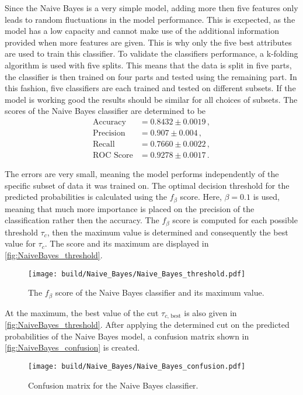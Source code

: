Since the Naive Bayes is a very simple model, adding more then five features only leads to random
fluctuations in the model performance. This is excpected, as the model has a low capacity and
cannot make use of the additional information provided when more features are given.
This is why only the five best attributes are used to train this classifier.
To validate the classifiers performance, a k-folding algorithm is used with five splits.
This means that the data is split in five parts, the classifier is then trained on four parts and tested using
the remaining part. In this fashion, five classifiers are each trained and tested on different subsets.
If the model is working good the results should be similar for all choices of subsets.
The scores of the Naive Bayes classifier are determined to be
\begin{align*}
  \text{Accuracy} &= 0.8432\pm0.0019 \,, \\
  \text{Precision} &= 0.907\pm0.004 \,, \\
  \text{Recall} &= 0.7660\pm0.0022 \,, \\
  \text{ROC Score} &= 0.9278\pm0.0017 \,.
\end{align*}

The errors are very small, meaning the model performs independently of the specific subset of data it was trained on.
The optimal decision threshold for the predicted probabilities is calculated using
the $f_\beta$ score. Here, $\beta=0.1$ is used, meaning that much more importance
is placed on the precision of the classification rather then the accuracy.
The $f_\beta$ score is computed for each possible threshold $\tau_c$, then
the maximum value is determined and consequently the best value for $\tau_c$.
The score and its maximum are displayed in \autoref{fig:NaiveBayes_threshold}.

\begin{figure}[H]
  \centering
  \texttt{[image: build/Naive\_Bayes/Naive\_Bayes\_threshold.pdf]}
  \caption{The $f_\beta$ score of the Naive Bayes classifier and its maximum value.}
  \label{fig:NaiveBayes_threshold}
\end{figure}

At the maximum, the best value of the cut $\tau_{c \text{, best}}$ is also given in \autoref{fig:NaiveBayes_threshold}.
After applying the determined cut on the predicted probabilities of the Naive Bayes model,
a confusion matrix shown in \autoref{fig:NaiveBayes_confusion} is created.

\begin{figure}[H]
  \centering
  \texttt{[image: build/Naive\_Bayes/Naive\_Bayes\_confusion.pdf]}
  \caption{Confusion matrix for the Naive Bayes classifier.}
  \label{fig:NaiveBayes_confusion}
\end{figure}

